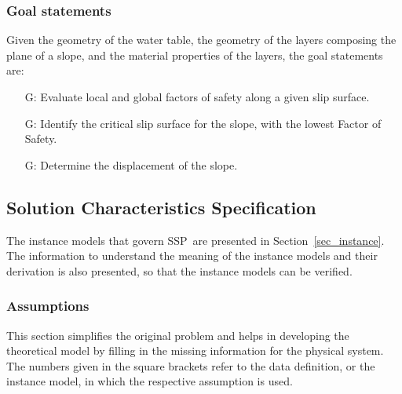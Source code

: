 \documentclass[12pt]{article}
\newcommand{\progname}{SSP}
\newcounter{goalnum} %
\begin{document}
\subsubsection{Goal statements}

Given the geometry of the water table, the geometry of the layers
composing the plane of a slope, and the material properties of the
layers, the goal statements are:

\begin{itemize}
\item [G\refstepcounter{goalnum}\thegoalnum: \label{G_FS}]
  {Evaluate local and global factors of safety along a given slip
    surface.}
  
\item [G\refstepcounter{goalnum}\thegoalnum: \label{G_Critical}]
  {Identify the critical slip surface for the slope, with the lowest
    Factor of Safety.}
  
\item [G\refstepcounter{goalnum}\thegoalnum: \label{G_Displacement}]
  {Determine the displacement of the slope.}
\end{itemize}

\subsection{Solution Characteristics Specification}

The instance models that govern \progname\ are presented in
Section~\ref{sec_instance}.  The information to understand the
meaning of the instance models and their derivation is also presented,
so that the instance models can be verified.

\subsubsection{Assumptions}
\label{Assumptions}
This section simplifies the original problem and helps in developing
the theoretical model by filling in the missing information for the
physical system. The numbers given in the square brackets refer to the
data definition, or the instance model, in which the respective
assumption is used.
\end{document}
